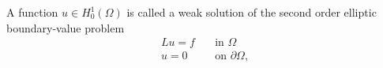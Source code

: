 \begin{defn}
    A function $u \in H_0^1(\Omega)$ is called a weak solution of the second order elliptic boundary-value problem
    \begin{align}
        Lu = f \quad &\text{in } \Omega \\
        u = 0 \quad &\text{on } \partial \Omega,
    \end{align}

\end{defn}